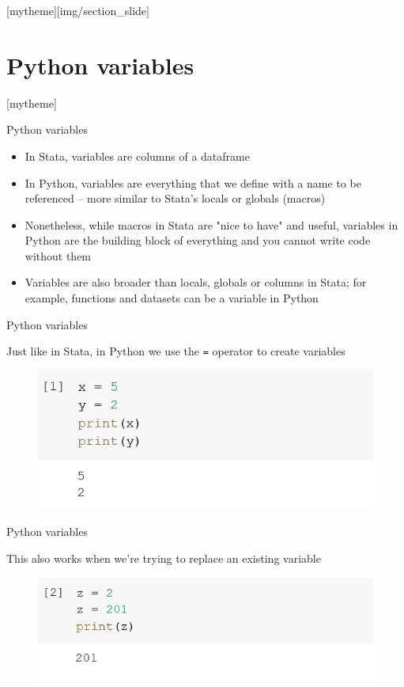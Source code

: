 \documentclass[aspectratio=169]{beamer}
\newcommand{\sectionpic}[2]{
	\setbeamertemplate{section page}[mytheme][#2]
	\section{#1}
	\setbeamertemplate{section page}[mytheme]
}
\begin{document}
\sectionpic{Python variables}{img/section_slide}

\begin{frame}{Python variables}

	\begin{itemize}
		\item In Stata, variables are columns of a dataframe
		\item In Python, variables are everything that we define with a name to be referenced -- more similar to Stata's locals or globals (macros)
		\item Nonetheless, while macros in Stata are "nice to have" and useful, variables in Python are the building block of everything and you cannot write code without them
		\item Variables are also broader than locals, globals or columns in Stata; for example, functions and datasets can be a variable in Python
	\end{itemize}

\end{frame}

\begin{frame}{Python variables}

	Just like in Stata, in Python we use the \texttt{=} operator to create variables

	\begin{figure}
		\centering
		\includegraphics[width=0.6\linewidth]{img/assignation.png}
	\end{figure}

\end{frame}

\begin{frame}{Python variables}

	This also works when we're trying to replace an existing variable

	\begin{figure}
		\centering
		\includegraphics[width=0.6\linewidth]{img/replace.png}
	\end{figure}

\end{frame}
\end{document}
